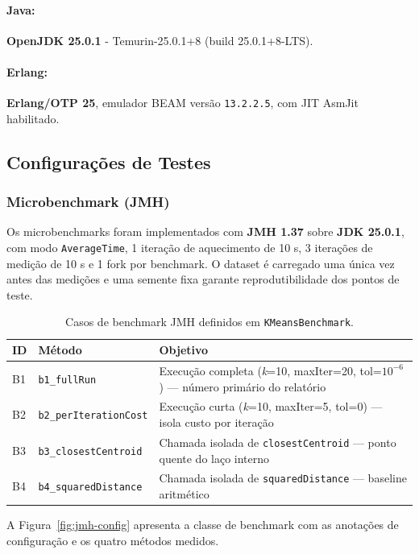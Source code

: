 \paragraph{Java:}
\textbf{OpenJDK 25.0.1} - Temurin-25.0.1+8 (build 25.0.1+8-LTS).

\paragraph{Erlang:}
\textbf{Erlang/OTP 25}, emulador BEAM versão \texttt{13.2.2.5}, com JIT AsmJit habilitado.
    
\subsection{Configurações de Testes}

\subsubsection{Microbenchmark (JMH)}

Os microbenchmarks foram implementados com \textbf{JMH 1.37} sobre \textbf{JDK 25.0.1},
com modo \texttt{AverageTime}, 1 iteração de aquecimento de 10 s, 3 iterações de
medição de 10 s e 1 fork por benchmark. O dataset é carregado uma única vez antes
das medições e uma semente fixa garante reprodutibilidade dos pontos de teste.

\begin{table}[H]
\centering
\begin{tabular}{llp{7cm}}
\hline
\textbf{ID} & \textbf{Método} & \textbf{Objetivo} \\
\hline
B1 & \texttt{b1\_fullRun}         & Execução completa (\textit{k}=10, maxIter=20, tol=\(10^{-6}\)) — número primário do relatório \\
B2 & \texttt{b2\_perIterationCost} & Execução curta (\textit{k}=10, maxIter=5, tol=0) — isola custo por iteração \\
B3 & \texttt{b3\_closestCentroid}  & Chamada isolada de \texttt{closestCentroid} — ponto quente do laço interno \\
B4 & \texttt{b4\_squaredDistance}  & Chamada isolada de \texttt{squaredDistance} — baseline aritmético \\
\hline
\end{tabular}
\caption{Casos de benchmark JMH definidos em \texttt{KMeansBenchmark}.}
\label{tab:jmh-cases}
\end{table}

A Figura~\ref{fig:jmh-config} apresenta a classe de benchmark com as anotações
de configuração e os quatro métodos medidos.

